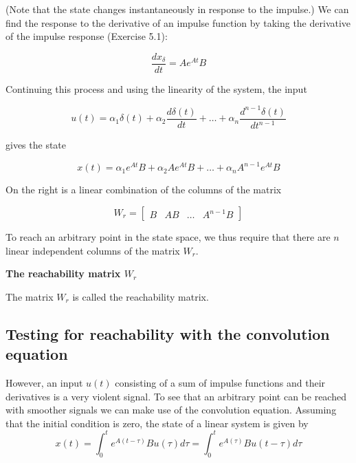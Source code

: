 (Note that the state changes instantaneously in response to the impulse.) We can
find the response to the derivative of an impulse function by taking the derivative
of the impulse response (Exercise 5.1):

\begin{equation}
\frac{dx_{\delta}}{dt} = Ae^{At}B
\end{equation}

Continuing this process and using the linearity of the system, the input

\begin{equation}
u(t) = \alpha_1\delta(t) + \alpha_2 \frac{d\delta(t)}{dt} + \dots +  \alpha_n \frac{d^{n-1}\delta(t)}{dt^{n-1}}  
\end{equation}

gives the state

\begin{equation}
x(t) = \alpha_1e^{At}B + \alpha_2Ae^{At}B + \dots +  \alpha_n A^{n-1}e^{At}B  
\end{equation}

On the right is a linear combination of the columns of the matrix

\begin{equation}
W_r = \begin{bmatrix}
 B & AB & \ldots & A^{n-1}B 
\end{bmatrix}
\end{equation}

To reach an arbitrary point  in the state  space,  we  thus  require that there are $n$ linear independent columns of the matrix $W_r$. 

\begin{framed}
\theoremstyle{remark}
\begin{remark}{\textbf{The reachability matrix $W_r$}}

The matrix $W_r$ is called the reachability
matrix.

\end{remark}
\end{framed}

\subsection{Testing for reachability with the convolution equation}

However, an input $u(t)$ consisting of a sum of impulse functions and their derivatives is a very
violent signal. To see that an arbitrary point can be reached with smoother signals we can make use of the convolution equation. Assuming that the initial condition is zero, the state of a linear system is given by
\begin{equation}
x(t)  = \int_{0}^{t} e^{A(t-\tau)}Bu(\tau)d\tau = \int_{0}^{t} e^{A(\tau)}Bu(t-\tau)d\tau
\end{equation}

